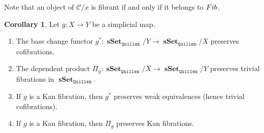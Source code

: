 \documentclass[10pt,letterpaper,cm]{nupset}
\theoremstyle{definition}
\theoremstyle{theorem}
\newtheorem{corollary}[definition]{Corollary}
\theoremstyle{remark}
\newcommand{\0}{\mathbf{0}}
\newcommand{\1}{\mathbf{1}}
\newcommand{\2}{\mathbf{2}}
\DeclareMathOperator{\sset}{\mathbf{sSet}}
\renewcommand{\c}{\mathscr{C}}
\DeclareMathOperator{\fib}{\mathnormal{Fib}}
\newcommand{\be}{\begin{enumerate}}
\newcommand{\ee}{\end{enumerate}}
\begin{document}
Note that an object of $\c/x$ is fibrant if and only if it belongs to $\fib$.

\smallskip

\begin{corollary}\label{adjpres}
Let $g : X \to Y$ be a simplicial map. 
\be[label=(\arabic*)]
\item The base change functor $g^{\ast} : \sset_{\mathtt{Quillen}}/Y \to \sset_{\mathtt{Quillen}}/X$ preserves cofibrations. 
\item  The dependent product $\Pi_g : \sset_{\mathtt{Quillen}}/X \to \sset_{\mathtt{Quillen}}/Y$ preserves trivial fibrations in $\sset_{\mathtt{Quillen}}$.


\item If $g$ is a Kan fibration, then $g^{\ast}$ preserves weak equivalences (hence trivial cofibrations).
\item  If $g$ is a Kan fibration, then  $\Pi_g$ preserves Kan fibrations.
\ee
\end{corollary}
\end{document}

